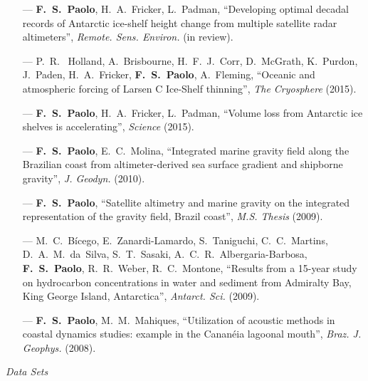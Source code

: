 \documentclass[a4paper,11pt]{article}
\begin{document}
\begin{minipage}{\textwidth}
\begin{flushleft}
\begin{itemize}
  \item[---] {\bf F.~S.~Paolo}, H.~A.~Fricker, L.~Padman, ``Developing optimal
        decadal records of Antarctic ice-shelf height change from multiple
        satellite radar altimeters'', \emph{Remote. Sens. Environ.} (in review).
  \item[---] P.~R.~ Holland, A.~Brisbourne, H.~F.~J.~Corr, D.~McGrath, K.~Purdon, 
        J.~Paden, H.~A.~Fricker, {\bf F.~S.~Paolo}, A.~Fleming, ``Oceanic and 
        atmospheric forcing of Larsen C Ice-Shelf thinning'', \emph{The Cryosphere} 
        (2015).
  \item[---] {\bf F.~S.~Paolo}, H.~A.~Fricker, L.~Padman, ``Volume loss 
        from Antarctic ice shelves is accelerating'', \emph{Science} (2015).
  \item[---] {\bf F.~S.~Paolo}, E.~C.~Molina, ``Integrated marine 
        gravity field along the Brazilian coast from altimeter-derived sea 
        surface gradient and shipborne gravity'', \emph{J. Geodyn.} (2010).
  \item[---] {\bf F.~S.~Paolo}, ``Satellite altimetry and marine gravity on the
        integrated representation of the gravity field, Brazil coast'',
        {\it M.S. Thesis} (2009).
  \item[---] M.~C.~B\'icego, E.~Zanardi-Lamardo, S.~Taniguchi, C.~C.~Martins, 
        D.~A.~M.~da~Silva, S.~T.~Sasaki, A.~C.~R.~Albergaria-Barbosa, {\bf F.~S.~Paolo},
        R.~R.~Weber, R.~C.~Montone, ``Results from a 15-year 
        study on hydrocarbon concentrations in water and sediment from 
        Admiralty Bay, King George Island, Antarctica'', \emph{Antarct. Sci.} 
        (2009).
  \item[---] {\bf F.~S.~Paolo}, M.~M.~Mahiques, ``Utilization of 
        acoustic methods in coastal dynamics studies: example in the 
        Canan\'eia lagoonal mouth'', \emph{Braz. J. Geophys.} (2008).
\end{itemize}
\end{flushleft}
\end{minipage}

\emph{Data Sets}
\end{document}
